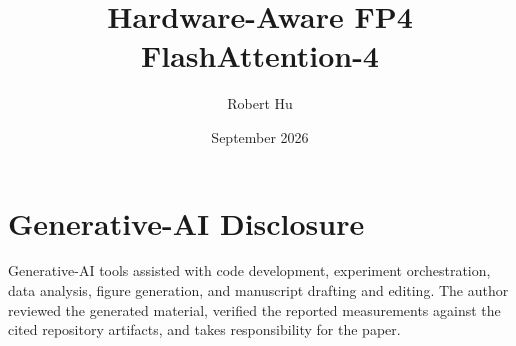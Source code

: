 \documentclass[11pt]{article}
\title{Hardware-Aware FP4 FlashAttention-4}
\author{Robert Hu}
\date{September 2026}
\begin{document}
\maketitle












\section*{Generative-AI Disclosure}
Generative-AI tools assisted with code development, experiment orchestration,
data analysis, figure generation, and manuscript drafting and editing.  The
author reviewed the generated material, verified the reported measurements
against the cited repository artifacts, and takes responsibility for the
paper.




\appendix







\end{document}
